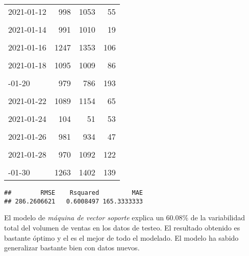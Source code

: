 \documentclass[
]{article}
\begin{document}
\begin{longtable}[t]{lrrr}
2021-01-12 & 998 & 1053 & 55\\
\cellcolor{gray!6}{2021-01-13} & \cellcolor{gray!6}{986} & \cellcolor{gray!6}{1018} & \cellcolor{gray!6}{32}\\
2021-01-14 & 991 & 1010 & 19\\
\addlinespace
\cellcolor{gray!6}{2021-01-15} & \cellcolor{gray!6}{1099} & \cellcolor{gray!6}{1098} & \cellcolor{gray!6}{1}\\
2021-01-16 & 1247 & 1353 & 106\\
\cellcolor{gray!6}{2021-01-17} & \cellcolor{gray!6}{104} & \cellcolor{gray!6}{53} & \cellcolor{gray!6}{51}\\
2021-01-18 & 1095 & 1009 & 86\\
\cellcolor{gray!6}{2021-01-19} & \cellcolor{gray!6}{981} & \cellcolor{gray!6}{1013} & \cellcolor{gray!6}{32}\\
\addlinespace
2021-01-20 & 979 & 786 & 193\\
\cellcolor{gray!6}{2021-01-21} & \cellcolor{gray!6}{969} & \cellcolor{gray!6}{980} & \cellcolor{gray!6}{11}\\
2021-01-22 & 1089 & 1154 & 65\\
\cellcolor{gray!6}{2021-01-23} & \cellcolor{gray!6}{1246} & \cellcolor{gray!6}{1319} & \cellcolor{gray!6}{73}\\
2021-01-24 & 104 & 51 & 53\\
\addlinespace
\cellcolor{gray!6}{2021-01-25} & \cellcolor{gray!6}{1095} & \cellcolor{gray!6}{1018} & \cellcolor{gray!6}{77}\\
2021-01-26 & 981 & 934 & 47\\
\cellcolor{gray!6}{2021-01-27} & \cellcolor{gray!6}{979} & \cellcolor{gray!6}{1148} & \cellcolor{gray!6}{169}\\
2021-01-28 & 970 & 1092 & 122\\
\cellcolor{gray!6}{2021-01-29} & \cellcolor{gray!6}{1128} & \cellcolor{gray!6}{1294} & \cellcolor{gray!6}{166}\\
\addlinespace
2021-01-30 & 1263 & 1402 & 139\\*
\end{longtable}

\begin{verbatim}
##        RMSE    Rsquared         MAE 
## 286.2606621   0.6008497 165.3333333
\end{verbatim}

El modelo de \emph{máquina de vector soporte} explica un 60.08\% de la
variabilidad total del volumen de ventas en los datos de testeo. El
resultado obtenido es bastante óptimo y el es el mejor de todo el
modelado. El modelo ha sabido generalizar bastante bien con datos
nuevos.
\end{document}
